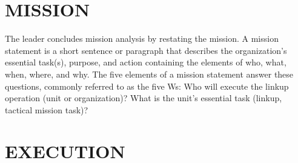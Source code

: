 \documentclass[letterpaper,tgtermes,9pt,microtype,colorlinks=true,urlcolor=blue,DIV=calc,pagesize]{scrartcl}
\begin{document}
\section{\textbf{MISSION}}
\label{sec:orgadaca35}
The leader concludes mission analysis by restating the mission. A mission statement is a short sentence or
paragraph that describes the organization’s essential task(s), purpose, and action containing the elements of who, what, when, where, and why. The five elements of a mission statement answer these questions, commonly referred to as the five Ws: Who will execute the linkup operation (unit or organization)? What is the unit’s essential task (linkup, tactical mission task)?
\section{\textbf{EXECUTION}}
\label{sec:org49ae2f1}
\end{document}
